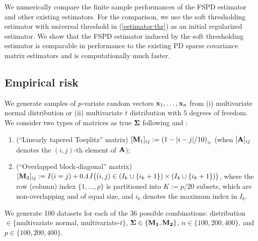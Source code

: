 \documentclass[times,sort&compress,3p]{elsarticle}
\newcommand{\BNUM}{\begin{enumerate}}
\newcommand{\ENUM}{\end{enumerate}}
\begin{document}
We numerically compare the finite sample performances of the
FSPD estimator and other existing estimators. For the comparison, we
use the soft thresholding estimator with universal threshold in (\ref{estimator:thr}) as
an initial regularized estimator. We show that the FSPD estimator induced by the soft thresholding
 estimator is comparable in performance to the existing PD sparse covariance matrix estimators
 and is computationally much faster.
 

 
 

\subsection{Empirical risk}\label{subsec:emperrcomp}

We generate samples of $p$-variate random vectors
${\bf x}_1, \ldots, {\bf x}_n$ from (i) multivariate normal distribution or (ii) multivariate $t$ distribution
 with $5$
degrees of freedom. 
We consider two types of matrices as true ${\bf \Sigma}$ following \citet{Rothman2012} and \citet{Xue2012}:

\BNUM
\item (``Linearly tapered Toeplitz'' matrix) $[{\bf M}_1]_{ij} := \left( 1 - |i-j|/10 \right)_+$ (when $[{\bf A}]_{ij}$ denotes
the $(i,j)$-th element of $\bf A$);
\item (``Overlapped block-diagonal'' matrix) $[{\bf M}_2]_{ij} := I(i = j) +  0.4 \, I \big( (i,j) \in (I_k \cup \{i_k + 1\}) \times (I_k \cup \{i_k + 1\}) \big)$, where the row (column) index $\{1, \ldots, p\}$ is partitioned into $K := p/20$ subsets, which are non-overlapping and of equal size, and $i_k$ denotes the maximum index in $I_k$.
\ENUM
We generate 100 datasets for each of the 36 possible combinations: distribution $\in \{$multivariate
normal, multivariate-$t\}$, $\bf \Sigma \in \{{\bf M}_1, {\bf M}_2\}$, $n \in \{100,200,400\}$, and $p \in \{100,200,400\}$.
\end{document}
